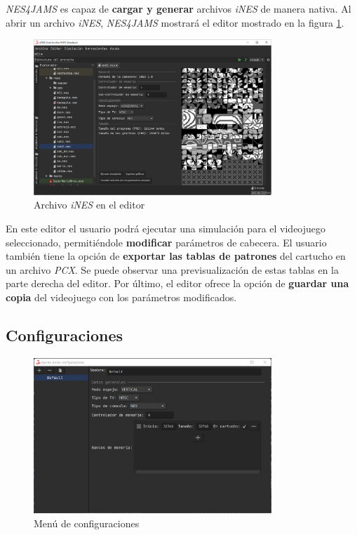 \textit{NES4JAMS} es capaz de \textbf{cargar y generar} archivos
\textit{iNES} de manera nativa.
Al abrir un archivo \textit{iNES}, \textit{NES4JAMS} mostrará
el editor mostrado en la figura \ref{fig:nes-ines-editor}.

\begin{figure}[h]
    \centering
    \includegraphics[width=0.8\textwidth]{images/nes/nes-ines-editor}
    \caption{Archivo \textit{iNES} en el editor}
    \label{fig:nes-ines-editor}
\end{figure}

En este editor el usuario podrá ejecutar una simulación
para el videojuego seleccionado, permitiéndole \textbf{modificar}
parámetros de cabecera.
El usuario también tiene la opción de \textbf{exportar las tablas
de patrones} del cartucho en un archivo \textit{PCX}.
Se puede observar una previsualización de estas tablas en la parte derecha del editor.
Por último, el editor ofrece la opción de \textbf{guardar una copia}
del videojuego con los parámetros modificados.

\subsection{Configuraciones}\label{subsec:configuraciones}

\begin{figure}[h]
    \centering
    \includegraphics[width=0.8\textwidth]{images/nes/nes-configurations}
    \caption{Menú de configuraciones}
    \label{fig:nes-configurations}
\end{figure}

